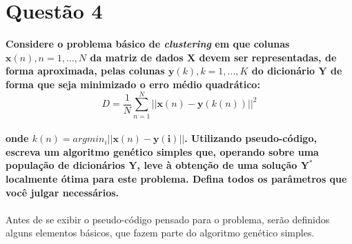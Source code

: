 \documentclass{report}
\begin{document}
\section*{Questão 4}

\textbf{Considere o problema básico de \textit{clustering} em que colunas $\mathbf{x}(n), n = 1,...,N$ da matriz de dados $\mathbf{X}$ devem ser representadas, de forma aproximada, pelas colunas $\mathbf{y}(k), k = 1,...,K$ do dicionário $\mathbf{Y}$ de forma que seja minimizado o erro médio quadrático:}\\

\begin{equation*}
D = \frac{1}{N} \sum_{n = 1}^{N}||\mathbf{x}(n) - \mathbf{y}(k(n))||^2
\end{equation*}\\

\textbf{onde $k(n) = argmin_i||\mathbf{x}(n) - \mathbf{y(i)}||$. Utilizando pseudo-código, escreva um algoritmo genético simples que, operando sobre uma população de dicionários $\mathbf{Y}$, leve à obtenção de uma solução $\mathbf{Y^*}$ localmente ótima para este problema. Defina todos os parâmetros que você julgar necessários.}\\

\paragraph{} Antes de se exibir o pseudo-código pensado para o problema, serão definidos alguns elementos básicos, que fazem parte do algoritmo genético simples.\\
\end{document}
